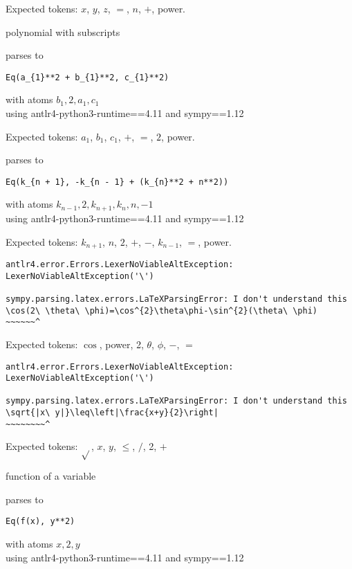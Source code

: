 \documentclass{article}
\begin{document}
Expected tokens: $x$, $y$, $z$, $=$, $n$, $+$, power.

\hrulefill

polynomial with subscripts
  
parses to
\begin{verbatim}
Eq(a_{1}**2 + b_{1}**2, c_{1}**2)
\end{verbatim}
with atoms ${b_{1}, 2, a_{1}, c_{1}}$\\
using antlr4-python3-runtime==4.11 and sympy==1.12

Expected tokens: $a_1$, $b_1$, $c_1$, $+$, $=$, $2$, power.

\hrulefill



parses to
\begin{verbatim}
Eq(k_{n + 1}, -k_{n - 1} + (k_{n}**2 + n**2))
\end{verbatim}
with atoms ${k_{n - 1}, 2, k_{n + 1}, k_{n}, n, -1}$\\
using antlr4-python3-runtime==4.11 and sympy==1.12

Expected tokens: $k_{n+1}$, $n$, $2$, $+$, $-$, $k_{n-1}$, $=$, power.

\hrulefill



\begin{verbatim}
antlr4.error.Errors.LexerNoViableAltException: LexerNoViableAltException('\')

sympy.parsing.latex.errors.LaTeXParsingError: I don't understand this
\cos(2\ \theta\ \phi)=\cos^{2}\theta\phi-\sin^{2}(\theta\ \phi)
~~~~~~^
\end{verbatim}


Expected tokens: $\cos$, power, 2, $\theta$, $\phi$, $-$, $=$

\hrulefill



\begin{verbatim}
antlr4.error.Errors.LexerNoViableAltException: LexerNoViableAltException('\')

sympy.parsing.latex.errors.LaTeXParsingError: I don't understand this
\sqrt{|x\ y|}\leq\left|\frac{x+y}{2}\right|
~~~~~~~~^
\end{verbatim}


Expected tokens: $\sqrt{}$, $x$, $y$, $\leq$, $/$, 2, $+$

\hrulefill


function of a variable

parses to
\begin{verbatim}
Eq(f(x), y**2)
\end{verbatim}
with atoms ${x, 2, y}$\\
using antlr4-python3-runtime==4.11 and sympy==1.12
\end{document}
